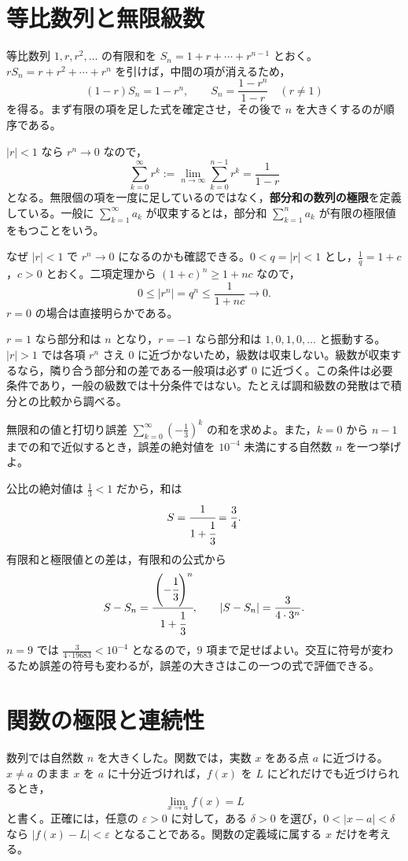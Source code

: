 \section{等比数列と無限級数}\label{節:等比級数}
等比数列 $1,r,r^2,\ldots$ の有限和を $S_n=1+r+\cdots+r^{n-1}$ とおく。$rS_n=r+r^2+\cdots+r^n$ を引けば，中間の項が消えるため，
\[
 (1-r)S_n=1-r^n,
 \qquad
 S_n=\frac{1-r^n}{1-r}\quad(r\ne1)
\]
を得る。まず有限の項を足した式を確定させ，その後で $n$ を大きくするのが順序である。

$|r|<1$ なら $r^n\to0$ なので，
\[
 \sum_{k=0}^{\infty}r^k
 :=\lim_{n\to\infty}\sum_{k=0}^{n-1}r^k
 =\frac1{1-r}
\]
となる。無限個の項を一度に足しているのではなく，\textbf{部分和の数列の極限}を定義している。一般に $\sum_{k=1}^{\infty}a_k$ が収束するとは，部分和 $\sum_{k=1}^{n}a_k$ が有限の極限値をもつことをいう。

なぜ $|r|<1$ で $r^n\to0$ になるのかも確認できる。$0<q=|r|<1$ とし，$\frac1q=1+c$，$c>0$ とおく。二項定理から $(1+c)^n\ge1+nc$ なので，
\[
 0\le |r^n|=q^n\le\frac1{1+nc}\longrightarrow0.
\]
$r=0$ の場合は直接明らかである。

$r=1$ なら部分和は $n$ となり，$r=-1$ なら部分和は $1,0,1,0,\ldots$ と振動する。$|r|>1$ では各項 $r^n$ さえ $0$ に近づかないため，級数は収束しない。級数が収束するなら，隣り合う部分和の差である一般項は必ず $0$ に近づく。この条件は必要条件であり，一般の級数では十分条件ではない。たとえば調和級数の発散はで積分との比較から調べる。

\begin{example}{無限和の値と打切り誤差}
$\sum_{k=0}^{\infty}\left(-\frac13\right)^k$ の和を求めよ。また，$k=0$ から $n-1$ までの和で近似するとき，誤差の絶対値を $10^{-4}$ 未満にする自然数 $n$ を一つ挙げよ。
\end{example}
公比の絶対値は $\frac13<1$ だから，和は
\[
 S=\cfrac{1}{1+\cfrac13}=\frac34.
\]
有限和と極限値との差は，有限和の公式から
\[
 S-S_n=\cfrac{\left(-\cfrac13\right)^n}{1+\cfrac13},
 \qquad
 |S-S_n|=\frac{3}{4\cdot3^n}.
\]
$n=9$ では $\frac3{4\cdot19683}<10^{-4}$ となるので，$9$ 項まで足せばよい。交互に符号が変わるため誤差の符号も変わるが，誤差の大きさはこの一つの式で評価できる。

\section{関数の極限と連続性}\label{節:関数極限連続}
数列では自然数 $n$ を大きくした。関数では，実数 $x$ をある点 $a$ に近づける。$x\ne a$ のまま $x$ を $a$ に十分近づければ，$f(x)$ を $L$ にどれだけでも近づけられるとき，
\[
 \lim_{x\to a}f(x)=L
\]
と書く。正確には，任意の $\varepsilon>0$ に対して，ある $\delta>0$ を選び，$0<|x-a|<\delta$ なら $|f(x)-L|<\varepsilon$ となることである。関数の定義域に属する $x$ だけを考える。

